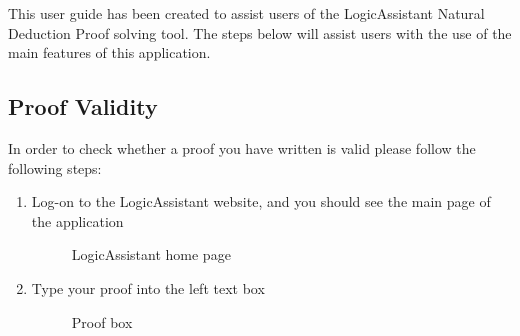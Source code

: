  
This user guide has been created to assist users of the LogicAssistant Natural Deduction Proof solving tool. The steps below will assist users with the use of the main features of this application.

\subsection{Proof Validity}

In order to check whether a proof you have written is valid please follow the following steps:

\begin{enumerate}
	\item Log-on to the LogicAssistant website, and you should see the main page of the application
			\begin{figure}[!ht]
				\centering
				\caption{LogicAssistant home page}
			\end{figure}
		
		\item Type your proof into the left text box
		
			\begin{figure}[!ht]
				\centering
				\caption{Proof box}
			\end{figure}
		

\end{enumerate}
